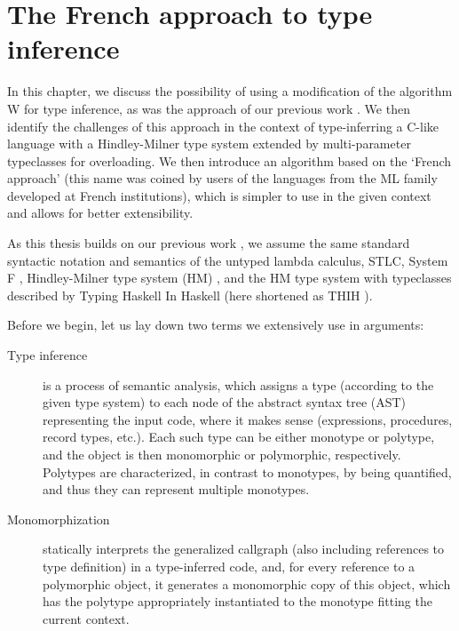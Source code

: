 \chapter{The French approach to type inference}

\label{chap1}

In this chapter, we discuss the possibility of using a modification of the algorithm W \cite{damas1982principal} for type inference, as was the approach of our previous work \cite{klepl2020type}. We then identify the challenges of this approach in the context of type-inferring a C-like language with a Hindley-Milner \cite{damas1982principal} type system extended by multi-parameter typeclasses for overloading. We then introduce an algorithm based on the `French approach' (this name was coined by users of the languages from the ML family developed at French institutions), which is simpler to use in the given context and allows for better extensibility.

As this thesis builds on our previous work \cite{klepl2020type}, we assume the same standard syntactic notation and semantics of the untyped lambda calculus, STLC, System F \cite{barendregt1992lambda}, Hindley-Milner type system (HM) \cite{damas1982principal}, and the HM type system with typeclasses described by Typing Haskell In Haskell (here shortened as THIH \cite{jones1999typing}).

Before we begin, let us lay down two terms we extensively use in arguments:

\begin{description}
\item[Type inference] is a process of semantic analysis, which assigns a type (according to the given type system) to each node of the abstract syntax tree (AST) representing the input code, where it makes sense (expressions, procedures, record types, etc.). Each such type can be either monotype or polytype, and the object is then monomorphic or polymorphic, respectively. Polytypes are characterized, in contrast to monotypes, by being quantified, and thus they can represent multiple monotypes.

\item[Monomorphization] statically interprets the generalized callgraph (also including references to type definition) in a type-inferred code, and, for every reference to a polymorphic object, it generates a monomorphic copy of this object, which has the polytype appropriately instantiated to the monotype fitting the current context.
\end{description}

